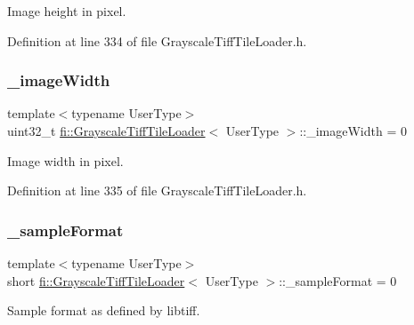 Image height in pixel. 



Definition at line 334 of file Grayscale\+Tiff\+Tile\+Loader.\+h.

\mbox{\label{classfi_1_1GrayscaleTiffTileLoader_ac4ed97a1e685ecbddeeba02dc27e2322}} 
\subsubsection{\texorpdfstring{\+\_\+image\+Width}{\_imageWidth}}
{\footnotesize\ttfamily template$<$typename User\+Type$>$ \\
uint32\+\_\+t \hyperlink{classfi_1_1GrayscaleTiffTileLoader}{fi\+::\+Grayscale\+Tiff\+Tile\+Loader}$<$ User\+Type $>$\+::\+\_\+image\+Width = 0\hspace{0.3cm}{\ttfamily [private]}}



Image width in pixel. 



Definition at line 335 of file Grayscale\+Tiff\+Tile\+Loader.\+h.

\mbox{\label{classfi_1_1GrayscaleTiffTileLoader_abc25413b9994a9c62dc2fb4f19bf774e}} 
\subsubsection{\texorpdfstring{\+\_\+sample\+Format}{\_sampleFormat}}
{\footnotesize\ttfamily template$<$typename User\+Type$>$ \\
short \hyperlink{classfi_1_1GrayscaleTiffTileLoader}{fi\+::\+Grayscale\+Tiff\+Tile\+Loader}$<$ User\+Type $>$\+::\+\_\+sample\+Format = 0\hspace{0.3cm}{\ttfamily [private]}}



Sample format as defined by libtiff. 



